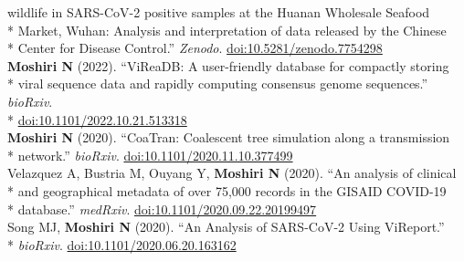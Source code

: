 \documentclass[margin,line]{res}
\begin{document}
\begin{resume}
\hspace*{9.5mm} wildlife in SARS-CoV-2 positive samples at the Huanan Wholesale Seafood\\*
\hspace*{9.5mm} Market, Wuhan: Analysis and interpretation of data released by the Chinese\\*\vspace{2mm}
\hspace*{8mm} Center for Disease Control.'' \textit{Zenodo}. \href{https://doi.org/10.5281/zenodo.7754298}{doi:10.5281/zenodo.7754298}\\
\hspace*{4mm} \textbf{Moshiri N} (2022). ``ViReaDB: A user-friendly database for compactly storing\\*
\hspace*{9.5mm} viral sequence data and rapidly computing consensus genome sequences.'' \textit{bioRxiv}.\\*\vspace{2mm}
\hspace*{8mm} \href{https://doi.org/10.1101/2022.10.21.513318}{doi:10.1101/2022.10.21.513318}\\
\hspace*{4mm} \textbf{Moshiri N} (2020). ``CoaTran: Coalescent tree simulation along a transmission\\*\vspace{2mm}
\hspace*{8mm} network.'' \textit{bioRxiv}. \href{https://doi.org/10.1101/2020.11.10.377499}{doi:10.1101/2020.11.10.377499}\\
\hspace*{4mm} Velazquez A, Bustria M, Ouyang Y, \textbf{Moshiri N} (2020). ``An analysis of clinical\\*
\hspace*{9.5mm} and geographical metadata of over 75,000 records in the GISAID COVID-19\\*\vspace{2mm}
\hspace*{8mm} database.'' \textit{medRxiv}. \href{https://doi.org/10.1101/2020.09.22.20199497}{doi:10.1101/2020.09.22.20199497}\\
\hspace*{4mm} Song MJ, \textbf{Moshiri N} (2020). ``An Analysis of SARS-CoV-2 Using ViReport.''\\*\vspace{2mm}
\hspace*{8mm} \textit{bioRxiv}. \href{https://doi.org/10.1101/2020.06.20.163162}{doi:10.1101/2020.06.20.163162}\\

\end{resume}
\end{document}
